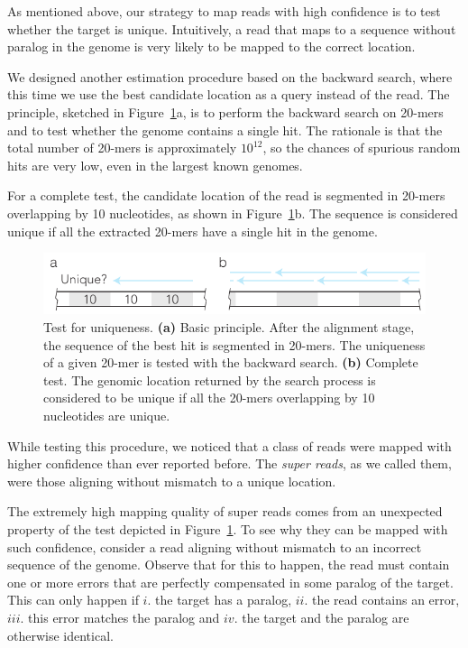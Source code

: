 \documentclass[english]{article}
\begin{document}
As mentioned above, our strategy to map reads with high confidence is to
test whether the target is unique. Intuitively, a read that maps to a
sequence without paralog in the genome is very likely to be mapped to the
correct location.

We designed another estimation procedure based on the backward search,
where this time we use the best candidate location as a query instead of
the read. The principle, sketched in Figure~\ref{fig_supertest}a, is to
perform the backward search on 20-mers and to test whether the genome
contains a single hit. The rationale is that the total number of 20-mers
is approximately $10^{12}$, so the chances of spurious random hits are
very low, even in the largest known genomes.

For a complete test, the candidate location of the read is segmented in
20-mers overlapping by 10 nucleotides, as shown in
Figure~\ref{fig_supertest}b. The sequence is considered unique if all the
extracted 20-mers have a single hit in the genome.

\begin{figure}[h]
\begin{center}
\includegraphics[scale=.75]{supertest.pdf}
\end{center}
\caption{Test for uniqueness. \textbf{(a)} Basic principle. After the
alignment stage, the sequence of the best hit is segmented in 20-mers. The
uniqueness of a given 20-mer is tested with the backward search.
\textbf{(b)} Complete test. The genomic location returned by the search
process is considered to be unique if all the 20-mers overlapping by 10
nucleotides are unique.}
\label{fig_supertest}
\end{figure}

While testing this procedure, we noticed that a class of reads were mapped
with higher confidence than ever reported before. The \emph{super reads},
as we called them, were those aligning without mismatch to a unique
location.

The extremely high mapping quality of super reads comes from an unexpected
property of the test depicted in Figure~\ref{fig_supertest}. To see why
they can be mapped with such confidence, consider a read aligning without
mismatch to an incorrect sequence of the genome. Observe that for this to
happen, the read must contain one or more errors that are perfectly
compensated in some paralog of the target. This can only happen if $i.$
the target has a paralog, $ii.$ the read contains an error, $iii.$ this
error matches the paralog and $iv.$ the target and the paralog are
otherwise identical.
\end{document}
